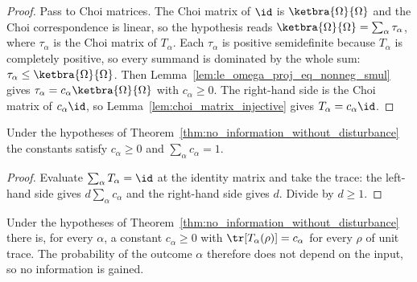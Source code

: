 \begin{proof}
    \leanok
    Pass to Choi matrices. The Choi matrix of $\id$ is
    $\ketbra{\Omega}{\Omega}$ and the Choi correspondence is linear, so the
    hypothesis reads $\ketbra{\Omega}{\Omega}=\sum_\alpha\tau_\alpha$,
    where $\tau_\alpha$ is the Choi matrix of $T_\alpha$. Each $\tau_\alpha$
    is positive semidefinite because $T_\alpha$ is completely positive, so
    every summand is dominated by the whole sum:
    $\tau_\alpha\leq\ketbra{\Omega}{\Omega}$. Then
    Lemma~\ref{lem:le_omega_proj_eq_nonneg_smul} gives
    $\tau_\alpha=c_\alpha\ketbra{\Omega}{\Omega}$ with $c_\alpha\geq0$. The
    right-hand side is the Choi matrix of $c_\alpha\id$, so
    Lemma~\ref{lem:choi_matrix_injective} gives $T_\alpha=c_\alpha\id$.
\end{proof}

\begin{theorem}
    \label{thm:no_information_weights_sum_one}
    \leanok
    Under the hypotheses of
    Theorem~\ref{thm:no_information_without_disturbance} the constants
    satisfy $c_\alpha\geq0$ and $\sum_\alpha c_\alpha=1$.
\end{theorem}

\begin{proof}
    \leanok
    Evaluate $\sum_\alpha T_\alpha=\id$ at the identity matrix and take the
    trace: the left-hand side gives $d\sum_\alpha c_\alpha$ and the
    right-hand side gives $d$. Divide by $d\geq1$.
\end{proof}

\begin{theorem}
    \label{thm:no_information_probability}
    \leanok
    Under the hypotheses of
    Theorem~\ref{thm:no_information_without_disturbance} there is, for every
    $\alpha$, a constant $c_\alpha\geq0$ with
    $\tr[T_\alpha(\rho)]=c_\alpha$ for every $\rho$ of unit trace. The
    probability of the outcome $\alpha$ therefore does not depend on the
    input, so no information is gained.
\end{theorem}

